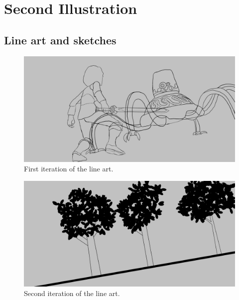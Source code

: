 \documentclass{cup-pan}
\begin{document}
\newpage
\newpage
\section{Second Illustration}

    \subsection{Line art and sketches}

        \begin{figure}[H]
            \includegraphics[width=\textwidth]{Imagenes/Fanart2/Boceto_Lineart/I Iteracion_LineArt.png}
            \caption{First iteration of the line art.}
        \end{figure}
        \begin{figure}[H]
            \includegraphics[width=\textwidth]{Imagenes/Fanart2/Boceto_Lineart/II Iteracion_LineArt.png}
            \caption{Second iteration of the line art.}
        \end{figure}
\end{document}
